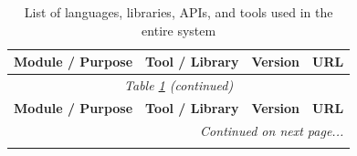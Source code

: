 \documentclass[../Main.tex]{subfiles}
\begin{document}
\renewcommand{\arraystretch}{1.2}
\begin{longtable}{ p{} p{} p{} p{} }
    \caption{List of languages, libraries, APIs, and tools used in the entire system}
    \label{table:tools_libraries_versions}                                                                                                                       \\
    \hline
    \textbf{Module / Purpose}       & \textbf{Tool / Library}               & \textbf{Version} & \textbf{URL}                                                    \\ \hline
    \endfirsthead

    \multicolumn{4}{c}{\textit{Table \ref{table:tools_libraries_versions} (continued)}}                                                                          \\
    \hline
    \textbf{Module / Purpose}       & \textbf{Tool / Library}               & \textbf{Version} & \textbf{URL}                                                    \\ \hline
    \endhead

    \hline \multicolumn{4}{r}{\textit{Continued on next page...}}                                                                                                \\
    \endfoot

    \hline
    \endlastfoot


\end{longtable}
\end{document}
